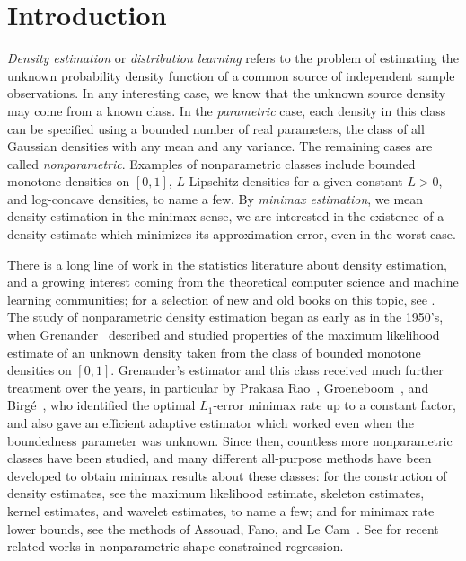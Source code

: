 \section{Introduction}

\emph{Density estimation} or \emph{distribution learning} refers to
the problem of estimating the unknown probability density function of
a common source of independent sample observations. In any interesting
case, we know that the unknown source density may come from a known
class. In the \emph{parametric} case, each density in this class can
be specified using a bounded number of real parameters, \eg the class
of all Gaussian densities with any mean and any variance. The
remaining cases are called \emph{nonparametric}. Examples of
nonparametric classes include bounded monotone densities on $[0, 1]$,
$L$-Lipschitz densities for a given constant $L > 0$, and log-concave
densities, to name a few. By \emph{minimax estimation}, we mean
density estimation in the minimax sense, \ie we are interested in the
existence of a density estimate which minimizes its approximation
error, even in the worst case.

There is a long line of work in the statistics literature about
density estimation, and a growing interest coming from the theoretical
computer science and machine learning communities; for a selection of
new and old books on this topic, see \cite{devroye-course,
  devroye-gyorfi, comb-methods, groeneboom-book, scott,
  silverman}. The study of nonparametric density estimation began as
early as in the 1950's, when Grenander~\cite{grenander} described and
studied properties of the maximum likelihood estimate of an unknown
density taken from the class of bounded monotone densities on
$[0, 1]$. Grenander's estimator and this class received much further
treatment over the years, in particular by Prakasa Rao~\cite{prakasa},
Groeneboom~\cite{groeneboom}, and Birg\'e~\cite{birge-order,
  birge-risk, birge}, who identified the optimal $L_1$-error minimax
rate up to a constant factor, and also gave an efficient adaptive
estimator which worked even when the boundedness parameter was
unknown. Since then, countless more nonparametric classes have been
studied, and many different all-purpose methods have been developed to
obtain minimax results about these classes: for the construction of
density estimates, see \eg the maximum likelihood estimate, skeleton
estimates, kernel estimates, and wavelet estimates, to name a few; and
for minimax rate lower bounds, see \eg the methods of Assouad, Fano,
and Le Cam~\cite{devroye-course, devroye-gyorfi, comb-methods,
  yu-survey}. See \cite{bellec, chat, gao, gunt} for recent related
works in nonparametric shape-constrained regression.

